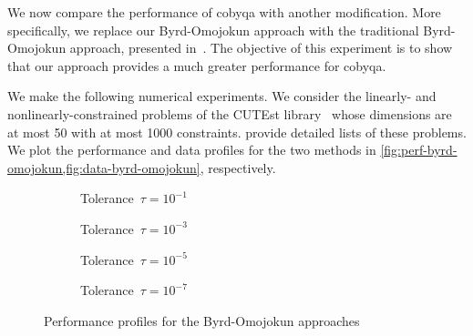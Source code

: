 We now compare the performance of \gls{cobyqa} with another modification.
More specifically, we replace our Byrd-Omojokun approach with the traditional Byrd-Omojokun approach, presented in~\cite[\S~15.4.4]{Conn_Gould_Toint_2000}.
The objective of this experiment is to show that our approach provides a much greater performance for \gls{cobyqa}.

We make the following numerical experiments.
We consider the linearly- and nonlinearly-constrained problems of the CUTEst library~\cite{Gould_Orban_Toint_2015} whose dimensions are at most \num{50} with at most \num[group-minimum-digits=4]{1000} constraints.
 provide detailed lists of these problems.
We plot the performance and data profiles for the two methods in \cref{fig:perf-byrd-omojokun,fig:data-byrd-omojokun}, respectively.

\begin{figure}[ht]
    \centering
    \begin{subfigure}[b]{0.49\textwidth}
        \centering
        \caption{Tolerance~$\tau = 10^{-1}$}
    \end{subfigure}
    \hfill
    \begin{subfigure}[b]{0.49\textwidth}
        \centering
        \caption{Tolerance~$\tau = 10^{-3}$}
    \end{subfigure}
    \begin{subfigure}[b]{0.49\textwidth}
        \centering
        \caption{Tolerance~$\tau = 10^{-5}$}
    \end{subfigure}
    \hfill
    \begin{subfigure}[b]{0.49\textwidth}
        \centering
        \caption{Tolerance~$\tau = 10^{-7}$}
    \end{subfigure}
    \caption{Performance profiles for the Byrd-Omojokun approaches}
    \label{fig:perf-byrd-omojokun}
\end{figure}


